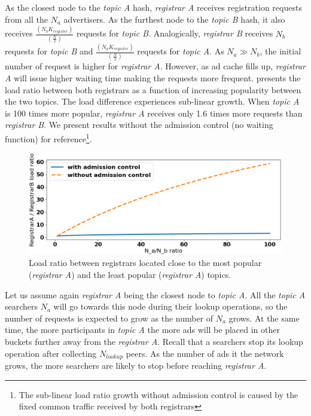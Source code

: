 As the closest node to the \emph{topic A} hash, \emph{registrar A} receives registration requests from all the $N_a$ advertisers. As the furthest node to the \emph{topic B} hash, it also receives $\frac{(N_{b}K_\textit{register})}{(\frac{N}{2})}$ requests for \emph{topic B}. Analogically, \emph{registrar B} receives $N_b$ requests for \emph{topic B} and $\frac{(N_{a}K_\textit{register})}{(\frac{N}{2})}$ requests for \emph{topic A}. As $N_a \gg N_b$, the initial number of request is higher for \emph{registrar A}. However, as ad cache fills up, \emph{registrar A} will issue higher waiting time making the requests more frequent.  presents the load ratio between both registrars as a function of increasing popularity between the two topics. The load difference experiences sub-linear growth. When \emph{topic A} is 100 times more popular, \emph{registrar A} receives only 1.6 times more requests than \emph{registrar B}. We present results without the admission control (\ie no waiting function) for reference\footnote{The sub-linear load ratio growth without admission control is caused by the fixed common traffic received by both registrars}. 

\begin{figure}[t]
    \includegraphics[width=1\linewidth]{img/fairness_registration}
    \caption{Load ratio between registrars located close to the most popular (\emph{registrar A}) and the least popular (\emph{registrar A}) topics.
    }
    \label{fig:fairness_registration}
\end{figure}

Let us assume again \emph{registrar A} being the closest node to \emph{topic A}. All the \emph{topic A} searchers $N_a$ will go towards this node during their lookup operations, so the number of requests is expected to grow as the number of $N_a$ grows. At the same time, the more participants in \emph{topic A} the more ads will be placed in other buckets further away from the \emph{registrar A}. Recall that a searchers stop its lookup operation after collecting $N_{lookup}$ peers. As the number of ads it the network grows, the more searchers are likely to stop before reaching \emph{registrar A}.  

